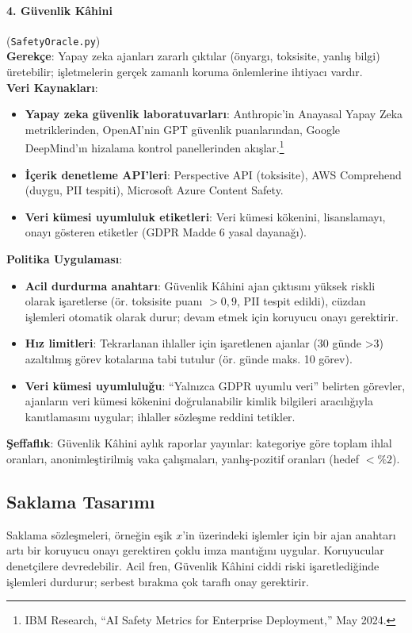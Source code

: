 \documentclass[11pt]{article}
\begin{document}
\paragraph{4. Güvenlik Kâhini} (\texttt{SafetyOracle.py})\\
\textbf{Gerekçe}: Yapay zeka ajanları zararlı çıktılar (önyargı, toksisite, yanlış bilgi) üretebilir; işletmelerin gerçek zamanlı koruma önlemlerine ihtiyacı vardır.\\
\textbf{Veri Kaynakları}:
\begin{itemize}[noitemsep]
  \item \textbf{Yapay zeka güvenlik laboratuvarları}: Anthropic'in Anayasal Yapay Zeka metriklerinden, OpenAI'nin GPT güvenlik puanlarından, Google DeepMind'ın hizalama kontrol panellerinden akışlar.\footnote{IBM Research, ``AI Safety Metrics for Enterprise Deployment,'' May 2024.}
  \item \textbf{İçerik denetleme API'leri}: Perspective API (toksisite), AWS Comprehend (duygu, PII tespiti), Microsoft Azure Content Safety.
  \item \textbf{Veri kümesi uyumluluk etiketleri}: Veri kümesi kökenini, lisanslamayı, onayı gösteren etiketler (GDPR Madde 6 yasal dayanağı).
\end{itemize}
\textbf{Politika Uygulaması}:
\begin{itemize}[noitemsep]
  \item \textbf{Acil durdurma anahtarı}: Güvenlik Kâhini ajan çıktısını yüksek riskli olarak işaretlerse (ör. toksisite puanı $>0,9$, PII tespit edildi), cüzdan işlemleri otomatik olarak durur; devam etmek için koruyucu onayı gerektirir.
  \item \textbf{Hız limitleri}: Tekrarlanan ihlaller için işaretlenen ajanlar (30 günde >3) azaltılmış görev kotalarına tabi tutulur (ör. günde maks. 10 görev).
  \item \textbf{Veri kümesi uyumluluğu}: ``Yalnızca GDPR uyumlu veri'' belirten görevler, ajanların veri kümesi kökenini doğrulanabilir kimlik bilgileri aracılığıyla kanıtlamasını uygular; ihlaller sözleşme reddini tetikler.
\end{itemize}
\textbf{Şeffaflık}: Güvenlik Kâhini aylık raporlar yayınlar: kategoriye göre toplam ihlal oranları, anonimleştirilmiş vaka çalışmaları, yanlış-pozitif oranları (hedef $<\%2$).

\subsection{Saklama Tasarımı}
Saklama sözleşmeleri, örneğin eşik $x$'in üzerindeki işlemler için bir ajan anahtarı artı bir koruyucu onayı gerektiren çoklu imza mantığını uygular. Koruyucular denetçilere devredebilir. Acil fren, Güvenlik Kâhini ciddi riski işaretlediğinde işlemleri durdurur; serbest bırakma çok taraflı onay gerektirir.
\end{document}
